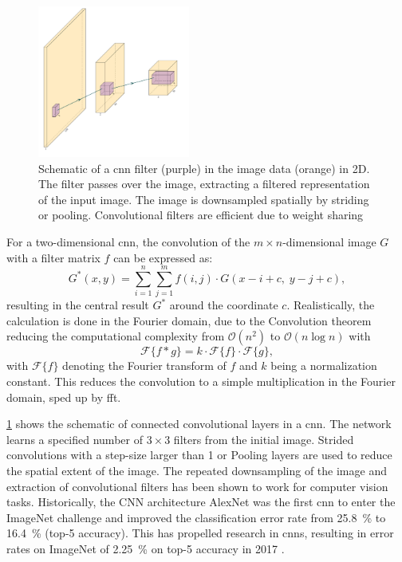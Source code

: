 \begin{figure}
    \centering
    \includegraphics[width=\textwidth,height=5cm,keepaspectratio]{figures/cnn_schema.pdf}
    \caption{Schematic of a \ac{cnn} filter (purple) in the image data (orange) in 2D. The filter passes over the image, extracting a filtered representation of the input image. The image is downsampled spatially by striding or pooling. Convolutional filters are efficient due to weight sharing}
    \label{fig:cnn}
\end{figure}

For a two-dimensional \ac{cnn}, the convolution of the $m\times n$-dimensional image $G$ with a filter matrix $f$ can be expressed as:
\begin{equation}
G^{*}(x,y) = \sum_{i=1}^{n} \sum_{j=1}^{m} f(i,j)\cdot G(x-i+c,\; y-j+c),
\end{equation}
resulting in the central result $G^{*}$ around the coordinate $c$. Realistically, the calculation is done in the Fourier domain, due to the Convolution theorem reducing the computational complexity from $\mathcal{O}(n^2)$ to $\mathcal{O}(n \log n)$ with
\begin{equation}
    \mathcal{F}\{f * g\} = k\cdot \mathcal{F}\{f\}\cdot \mathcal{F}\{g\},
\end{equation}
with $\mathcal{F} \{ f\}$ denoting the Fourier transform of $f$ and $k$ being a normalization constant. This reduces the convolution to a simple multiplication in the Fourier domain, sped up by \ac{fft}.

\cref{fig:cnn} shows the schematic of connected convolutional layers in a \ac{cnn}. The network learns a specified number of $3\times3$ filters from the initial image. Strided convolutions with a step-size larger than 1 or Pooling layers are used to reduce the spatial extent of the image. The repeated downsampling of the image and extraction of convolutional filters has been shown to work for computer vision tasks. Historically, the CNN architecture AlexNet \citep{krizhevsky2012imagenet} was the first \ac{cnn} to enter the ImageNet challenge and improved the classification error rate from 25.8~\% to 16.4~\% (top-5 accuracy). This has propelled research in \acp{cnn}, resulting in error rates on ImageNet of 2.25~\% on top-5 accuracy in 2017 \citep{imagenetresults}.

